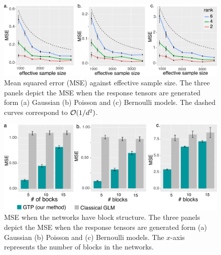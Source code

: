 \documentclass{article}
\theoremstyle{plain}
\theoremstyle{definition}
\begin{document}
\begin{figure}[ht]
\centering
\includegraphics[width=14cm]{dimension.pdf}
\caption{Mean squared error (MSE) against effective sample size. The three panels depict the MSE when the response tensors are generated form (a) Gaussian (b) Poisson and (c) Bernoulli models. The dashed curves correspond to $\mathcal{O}({1/d^2})$.}\label{fig:dim}
\vspace{-.5cm}
\end{figure}


\begin{figure}[ht]
\centering
\includegraphics[width=14cm]{comparison.pdf}
\caption{MSE when the networks have block structure. The three panels depict the MSE when the response tensors are generated form (a) Gaussian (b) Poisson and (c) Bernoulli models. The $x$-axis represents the number of blocks in the networks. }\label{fig:glm}
\vspace{-.4cm}
\end{figure}

\fi
\end{document}
